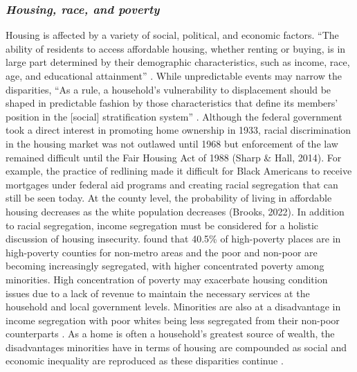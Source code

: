 \subsubsection{\textit{Housing, race, and poverty}}
Housing is affected by a variety of social, political, and economic factors. “The ability of residents to access affordable housing, whether renting or buying, is in large part determined by their demographic characteristics, such as income, race, age, and educational attainment” \citep[115]{yadavalli_comprehensive_2023}. While unpredictable events may narrow the disparities, “As a rule, a household’s vulnerability to displacement should be shaped in predictable fashion by those characteristics that define its members’ position in the [social] stratification system” \citep[5]{lee_forced_2020}. Although the federal government took a direct interest in promoting home ownership in 1933, racial discrimination in the housing market was not outlawed until 1968 but enforcement of the law remained difficult until the Fair Housing Act of 1988 (Sharp \& Hall, 2014). For example, the practice of redlining made it difficult for Black Americans to receive mortgages under federal aid programs and creating racial segregation that can still be seen today. At the county level, the probability of living in affordable housing decreases as the white population decreases (Brooks, 2022). In addition to racial segregation, income segregation must be considered for a holistic discussion of housing insecurity. \citet{lichter_rural_2011} found that 40.5\% of high-poverty places are in high-poverty counties for non-metro areas and the poor and non-poor are becoming increasingly segregated, with higher concentrated poverty among minorities. High concentration of poverty may exacerbate housing condition issues due to a lack of revenue to maintain the necessary services at the household and local government levels. Minorities are also at a disadvantage in income segregation with poor whites being less segregated from their non-poor counterparts \citep{lichter_ruralurban_2021}. As a home is often a household's greatest source of wealth, the disadvantages minorities have in terms of housing are compounded as social and economic inequality are reproduced as these disparities continue \citep{krivo_housing_2004}.  

